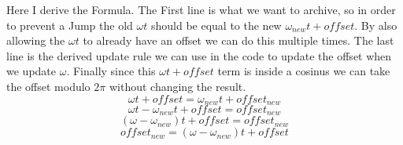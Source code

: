 Here I derive the Formula. The First line is what we want to archive, so in order to prevent a Jump the old $\omega t$ should be equal to the new $\omega_{new}t + offset$. By also allowing the $\omega t$ to already have an offset we can do this multiple times. The last line is the derived update rule we can use in the code to update the offset when we update $\omega$. Finally since this $\omega t + offset$ term is inside a cosinus we can take the offset modulo $2\pi$ without changing the result.
\[ \omega t + offset = \omega_{new} t + offset_{new} \]
\[ \omega t - \omega_{new} t + offset = offset_{new} \]
\[ (\omega - \omega_{new}) t + offset = offset_{new} \]
\[ offset_{new} = (\omega - \omega_{new}) t + offset \]


